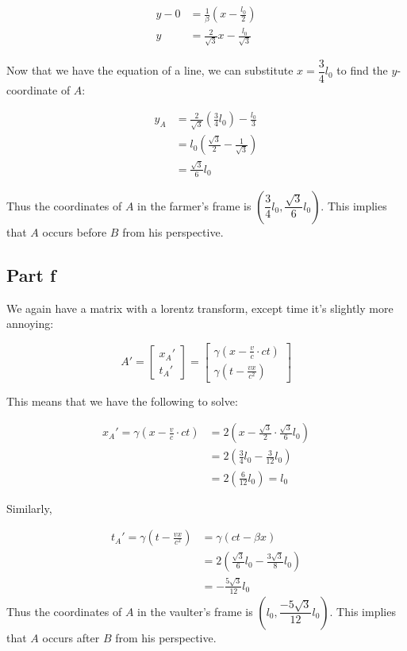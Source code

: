 \documentclass{article}
\theoremstyle{definition}
\numberwithin{equation}{section}
\numberwithin{definition}{section}
\begin{document}
		\begin{align*}
			y - 0 &= \frac{1}{\beta}\left(x - \frac{l_0}{2}\right)\\
			y &= \frac{2}{\sqrt{3}}x - \frac{l_0}{\sqrt{3}}
		\end{align*}
	
	Now that we have the equation of a line, we can substitute $x = \dfrac{3}{4}l_0$ to find the $y$-coordinate of $A$:
	
	\begin{align*}
		y_A &= \frac{2}{\sqrt{3}}\left(\frac{3}{4}l_0\right) - \frac{l_0}{3}\\
		&= l_0\left(\frac{\sqrt{3}}{2} - \frac{1}{\sqrt{3}}\right)\\
		&= \frac{\sqrt{3}}{6} l_0
		\end{align*}
	
	Thus the coordinates of $A$ in the farmer's frame is $\left(\dfrac{3}{4}l_0, \dfrac{\sqrt{3}}{6}l_0\right)$. This implies that $A$ occurs before $B$ from his perspective.
	
	\subsection{Part f}

We again have a matrix with a lorentz transform, except time it's slightly more annoying:

\[ A' = \begin{bmatrix}
	x_A' \\
	t_A' 
\end{bmatrix} = \begin{bmatrix}
\gamma(x - \frac{v}{c} \cdot ct) \\
\gamma \left(t - \frac{vx}{c^2}\right) 
\end{bmatrix}\]

This means that we have the following to solve:

\begin{align*}
	x_A'= \gamma\left(x - \frac{v}{c} \cdot ct\right) &= 2\left(x - \frac{\sqrt{3}}{2} \cdot \frac{\sqrt{3}}{6}l_0\right) \\
	&= 2\left(\frac{3}{4}l_0 - \frac{3}{12}l_0\right)\\
	&= 2\left(\frac{6}{12} l_0\right) = l_0
\end{align*}

Similarly,

\begin{align*}
	t_A' = \gamma\left(t - \frac{vx}{c^2}\right) &= \gamma(ct - \beta x)\\
	&= 2\left(\frac{\sqrt{3}}{6}l_0 - \frac{3 \sqrt{3}}{8}l_0\right)\\
	&= -\frac{5\sqrt{3}}{12}l_0
\end{align*}
Thus the coordinates of $A$ in the vaulter's frame is $\left(l_0, \dfrac{-5\sqrt{3}}{12}l_0\right)$. This implies that $A$ occurs after $B$ from his perspective.
\end{document}
